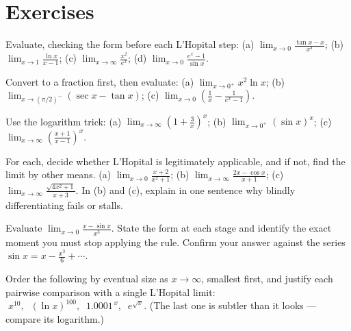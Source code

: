 \section{Exercises}

\begin{exercise}
Evaluate, checking the form before each L'Hopital step:
(a) $\displaystyle\lim_{x\to 0}\frac{\tan x - x}{x^3}$;\quad
(b) $\displaystyle\lim_{x\to 1}\frac{\ln x}{x-1}$;\quad
(c) $\displaystyle\lim_{x\to\infty}\frac{x^2}{e^{x}}$;\quad
(d) $\displaystyle\lim_{x\to 0}\frac{e^{x}-1}{\sin x}$.
\end{exercise}

\begin{exercise}
Convert to a fraction first, then evaluate:
(a) $\displaystyle\lim_{x\to 0^+}x^2\ln x$;\quad
(b) $\displaystyle\lim_{x\to (\pi/2)^-}(\sec x - \tan x)$;\quad
(c) $\displaystyle\lim_{x\to 0}\left(\frac{1}{x}-\frac{1}{e^x-1}\right)$.
\end{exercise}

\begin{exercise}
Use the logarithm trick:
(a) $\displaystyle\lim_{x\to\infty}\left(1+\frac{3}{x}\right)^{x}$;\quad
(b) $\displaystyle\lim_{x\to 0^+}(\sin x)^{x}$;\quad
(c) $\displaystyle\lim_{x\to\infty}\left(\frac{x+1}{x-1}\right)^{x}$.
\end{exercise}

\begin{exercise}
For each, decide whether L'Hopital is legitimately applicable, and if not, find the
limit by other means.
(a) $\displaystyle\lim_{x\to 0}\frac{x+2}{x^2+1}$;\quad
(b) $\displaystyle\lim_{x\to\infty}\frac{2x-\cos x}{x+1}$;\quad
(c) $\displaystyle\lim_{x\to\infty}\frac{\sqrt{4x^2+1}}{x+3}$.
In (b) and (c), explain in one sentence why blindly differentiating fails or stalls.
\end{exercise}

\begin{exercise}
Evaluate $\displaystyle\lim_{x\to 0}\frac{x-\sin x}{x^3}$. State the form at each stage
and identify the exact moment you must stop applying the rule. Confirm your answer
against the series $\sin x = x-\tfrac{x^3}{6}+\cdots$.
\end{exercise}

\begin{exercise}
Order the following by eventual size as $x\to\infty$, smallest first, and justify each
pairwise comparison with a single L'Hopital limit:
$\;x^{10},\;\; (\ln x)^{100},\;\; 1.0001^{\,x},\;\; e^{\sqrt{x}}.$
(The last one is subtler than it looks --- compare its logarithm.)
\end{exercise}

